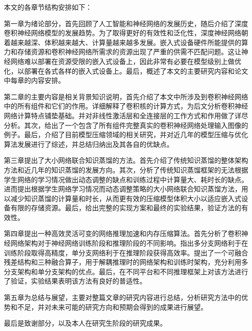 本文的各章节结构安排如下：

第一章为绪论部分，首先回顾了人工智能和神经网络的发展历史，随后介绍了深度卷积神经网络模型的发展趋势。为了取得更好的有效性和泛化性，深度神经网络朝着越来越深、体积越来越大、计算量越来越多发展。嵌入式设备硬件所能提供的算力和存储资源和卷积神经网络所需求的资源出现了严重的供需不匹配问题。这让神经网络难以部署在资源受限的嵌入式设备上，因此非常有必要在模型级别上做优化，以部署在各式各样的嵌入式设备上。最后，概述了本文的主要研究内容和论文中每章的内容安排。

第二章的主要内容是相关背景知识说明，首先介绍了本文中所涉及到卷积神经网络中的所有组件和它们的作用。详细解释了卷积核的计算方式，为后文分析卷积神经网络计算特点铺垫基础。并对非线性激活层和全连接层的工作方式和作用做了详尽分析。其次，给出了一个包含了所有组件完整真实的卷积神经网络处理输入图像的例子。最后，介绍了目前模型压缩领域的相关研究，并对近几年的模型压缩与优化算法发展进行了综述，并总结归纳出及其各自的优缺点。

第三章提出了大小网络联合知识蒸馏的方法。首先介绍了传统知识蒸馏的整体架构方法和近几年的知识蒸馏的发展方向。其次，分析了传统知识蒸馏框架的无法根据学生网络的学习情况做出动态调整的缺点和训练过程中计算量大、耗时长的缺点。进而提出根据学生网络学习情况而动态调整策略的大小网络联合知识蒸馏方法，用以减少知识蒸馏的计算量和时长，从而更有效的压缩模型体积大小以适应嵌入式设备有限的存储资源。最后，给出完整的实现方案和最终的实验结果，验证方法的有效性。

第四章提出一种高效灵活可变的网络推理加速和内存压缩算法。首先分析了卷积神经网络架构对于神经网络训练阶段和推理阶段的不同影响。指出多分支网络利于在训练阶段取得高精度，单分支网络利于在推理阶段获得高效率。提出了一个可融合残差结构和三种融合算子，用于解耦推理时的网络架构和训练时架构，充分利用多分支架构和单分支架构的优点。最后，在不同平台和不同推理框架上对该方法进行了验证，实验结果表明该方法有良好的普适性。

第五章为总结与展望，主要对整篇文章的研究内容进行总结，分析研究方法中的优势和不足，并对未来可能的研究方向和预期会得到的成果进行展望。

最后是致谢部分，以及本人在研究生阶段的研究成果。

